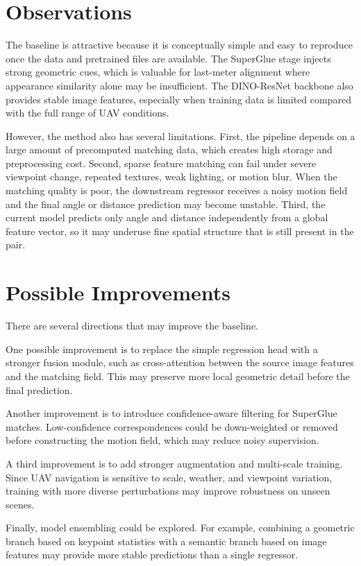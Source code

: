 \documentclass[sigconf]{acmart}
\begin{document}
\section{Observations}
The baseline is attractive because it is conceptually simple and easy to reproduce once the data and pretrained files are available. The SuperGlue stage injects strong geometric cues, which is valuable for last-meter alignment where appearance similarity alone may be insufficient. The DINO-ResNet backbone also provides stable image features, especially when training data is limited compared with the full range of UAV conditions.

However, the method also has several limitations. First, the pipeline depends on a large amount of precomputed matching data, which creates high storage and preprocessing cost. Second, sparse feature matching can fail under severe viewpoint change, repeated textures, weak lighting, or motion blur. When the matching quality is poor, the downstream regressor receives a noisy motion field and the final angle or distance prediction may become unstable. Third, the current model predicts only angle and distance independently from a global feature vector, so it may underuse fine spatial structure that is still present in the pair.

\section{Possible Improvements}
There are several directions that may improve the baseline.

One possible improvement is to replace the simple regression head with a stronger fusion module, such as cross-attention between the source image features and the matching field. This may preserve more local geometric detail before the final prediction.

Another improvement is to introduce confidence-aware filtering for SuperGlue matches. Low-confidence correspondences could be down-weighted or removed before constructing the motion field, which may reduce noisy supervision.

A third improvement is to add stronger augmentation and multi-scale training. Since UAV navigation is sensitive to scale, weather, and viewpoint variation, training with more diverse perturbations may improve robustness on unseen scenes.

Finally, model ensembling could be explored. For example, combining a geometric branch based on keypoint statistics with a semantic branch based on image features may provide more stable predictions than a single regressor.
\end{document}
